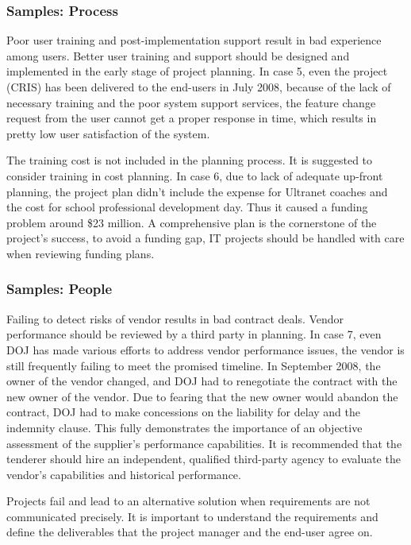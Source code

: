 \subsubsection{Samples: Process}
Poor user training and post-implementation support result in bad experience among users. Better user training and support should be designed and implemented in the early stage of project planning. In case 5, even the project (CRIS) has been delivered to the end-users in July 2008, because of the lack of necessary training and the poor system support services, the feature change request from the user cannot get a proper response in time, which results in pretty low user satisfaction of the system.

The training cost is not included in the planning process. It is suggested to consider training in cost planning. In case 6, due to lack of adequate up-front planning, the project plan didn't include the expense for Ultranet coaches and the cost for school professional development day. Thus it caused a funding problem around \$23 million. A comprehensive plan is the cornerstone of the project's success, to avoid a funding gap, IT projects should be handled with care when reviewing funding plans.

\subsubsection{Samples: People}
Failing to detect risks of vendor results in bad contract deals. Vendor performance should be reviewed by a third party in planning. In case 7, even DOJ has made various efforts to address vendor performance issues, the vendor is still frequently failing to meet the promised timeline. In September 2008, the owner of the vendor changed, and DOJ had to renegotiate the contract with the new owner of the vendor. Due to fearing that the new owner would abandon the contract, DOJ had to make concessions on the liability for delay and the indemnity clause. This fully demonstrates the importance of an objective assessment of the supplier's performance capabilities. It is recommended that the tenderer should hire an independent, qualified third-party agency to evaluate the vendor's capabilities and historical performance.


Projects fail and lead to an alternative solution when requirements are not communicated precisely. It is important to understand the requirements and define the deliverables that the project manager and the end-user agree on.

